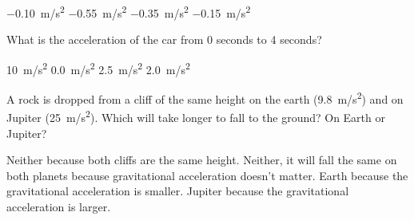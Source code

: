 \documentclass[]{exam}
\begin{document}
\begin{questions}
\begin{randomizechoices}[norandomize]
    \correctchoice \SI{-0.10}{m/s^2}
    \choice \SI{-0.55}{m/s^2}
    \choice \SI{-0.35}{m/s^2}
    \choice \SI{-0.15}{m/s^2}
\end{randomizechoices}

\question 
What is the acceleration of the car from 0 seconds to 4 seconds?

\begin{center}
\end{center}

\begin{randomizechoices}[norandomize]
    \choice \SI{10}{m/s^2}
    \choice \SI{0.0}{m/s^2}
    \correctchoice \SI{2.5}{m/s^2}
    \choice \SI{2.0}{m/s^2}
\end{randomizechoices}




\clearpage

\question
A rock is dropped from a cliff of the same height on the earth (\SI{9.8}{m/s^2}) and on Jupiter (\SI{25}{m/s^2}). Which will take longer to fall to the ground? On Earth or Jupiter?

\begin{randomizechoices}[norandomize]
    \choice Neither because both cliffs are the same height.
    \choice Neither, it will fall the same on both planets because gravitational acceleration doesn’t matter.
    \correctchoice Earth because the gravitational acceleration is smaller.
    \choice Jupiter because the gravitational acceleration is larger. 
\end{randomizechoices}


\end{questions}
\end{document}
